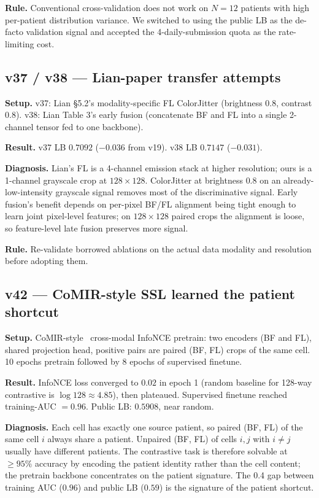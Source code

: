 \documentclass[conference]{IEEEtran}
\begin{document}
\textbf{Rule.} Conventional cross-validation does not work on $N=12$ patients with high per-patient distribution variance. We switched to using the public LB as the de-facto validation signal and accepted the 4-daily-submission quota as the rate-limiting cost.

\subsection{v37 / v38 --- Lian-paper transfer attempts}

\textbf{Setup.} v37: Lian \S5.2's modality-specific FL ColorJitter (brightness $0.8$, contrast $0.8$). v38: Lian Table 3's early fusion (concatenate BF and FL into a single 2-channel tensor fed to one backbone).

\textbf{Result.} v37 LB $0.7092$ ($-0.036$ from v19). v38 LB $0.7147$ ($-0.031$).

\textbf{Diagnosis.} Lian's FL is a 4-channel emission stack at higher resolution; ours is a 1-channel grayscale crop at $128 \times 128$. ColorJitter at brightness $0.8$ on an already-low-intensity grayscale signal removes most of the discriminative signal. Early fusion's benefit depends on per-pixel BF/FL alignment being tight enough to learn joint pixel-level features; on $128 \times 128$ paired crops the alignment is loose, so feature-level late fusion preserves more signal.

\textbf{Rule.} Re-validate borrowed ablations on the actual data modality and resolution before adopting them.

\subsection{v42 --- CoMIR-style SSL learned the patient shortcut}

\textbf{Setup.} CoMIR-style~\cite{pielawski2020comir} cross-modal InfoNCE pretrain: two encoders (BF and FL), shared projection head, positive pairs are paired (BF, FL) crops of the same cell. 10 epochs pretrain followed by 8 epochs of supervised finetune.

\textbf{Result.} InfoNCE loss converged to $0.02$ in epoch 1 (random baseline for 128-way contrastive is $\log 128 \approx 4.85$), then plateaued. Supervised finetune reached training-AUC $= 0.96$. Public LB: $0.5908$, near random.

\textbf{Diagnosis.} Each cell has exactly one source patient, so paired (BF, FL) of the same cell $i$ always share a patient. Unpaired (BF, FL) of cells $i, j$ with $i \ne j$ usually have different patients. The contrastive task is therefore solvable at $\ge 95\%$ accuracy by encoding the patient identity rather than the cell content; the pretrain backbone concentrates on the patient signature. The 0.4 gap between training AUC ($0.96$) and public LB ($0.59$) is the signature of the patient shortcut.
\end{document}
